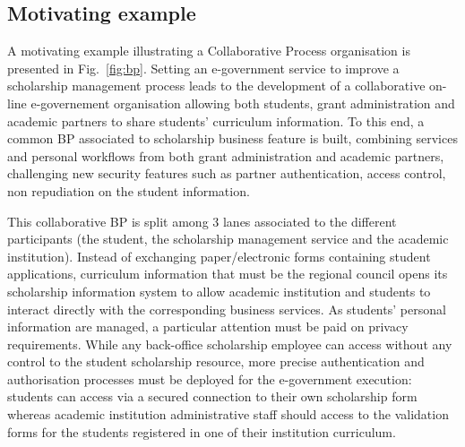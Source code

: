 \documentclass[runningheads,a4paper]{llncs}
\begin{document}
\subsection{Motivating example}
\label{example}

A motivating example illustrating a Collaborative Process organisation is presented in Fig.~\ref{fig:bp}. Setting an e-government service to improve a scholarship management process leads to the development of a collaborative on-line e-governement organisation allowing both students, grant administration and academic partners to share students' curriculum information. To this end, a common BP associated to scholarship business feature is built, combining services and personal workflows from both grant administration and academic partners, challenging new security features such as partner authentication, access control, non repudiation on the student information. 


This collaborative BP is split among 3 lanes associated to the different participants (the student, the scholarship management service and the academic institution). Instead of exchanging paper/electronic forms containing student applications, curriculum information that must be the regional council opens its scholarship information system to allow academic institution and students to interact directly with the corresponding business services. As students' personal information are managed, a particular attention must be paid on privacy requirements. While any back-office scholarship employee can access without any control to the student scholarship resource, more precise authentication and authorisation processes must be deployed for the e-government execution: students can access via a secured connection to their own scholarship form whereas academic institution administrative staff should access to the validation forms for the students registered in one of their institution curriculum.
\end{document}
